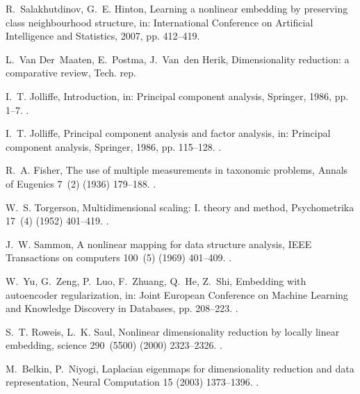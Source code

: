 \documentclass[preprint,5p,compress]{elsarticle}
\begin{document}
\begin{thebibliography}{100}
R.~Salakhutdinov, G.~E. Hinton, Learning a nonlinear embedding by preserving
  class neighbourhood structure, in: International Conference on Artificial
  Intelligence and Statistics, 2007, pp. 412--419.

L.~Van Der~Maaten, E.~Postma, J.~Van~den Herik, Dimensionality reduction: a
  comparative review, Tech. rep.

I.~T. Jolliffe, Introduction, in: Principal component analysis, Springer, 1986,
  pp. 1--7.
\newblock \href {http://dx.doi.org/10.1007/978-1-4757-1904-8}
  {}.

I.~T. Jolliffe, Principal component analysis and factor analysis, in: Principal
  component analysis, Springer, 1986, pp. 115--128.
\newblock \href {http://dx.doi.org/10.1007/978-1-4757-1904-8}
  {}.

R.~A. Fisher, The use of multiple measurements in taxonomic problems, Annals of
  Eugenics 7~(2) (1936) 179--188.
\newblock \href {http://dx.doi.org/10.1111/j.1469-1809.1936.tb02137.x}
  {}.

W.~S. Torgerson, Multidimensional scaling: I. theory and method, Psychometrika
  17~(4) (1952) 401--419.
\newblock \href {http://dx.doi.org/10.1007/BF02288916}
  {}.

J.~W. Sammon, A nonlinear mapping for data structure analysis, IEEE
  Transactions on computers 100~(5) (1969) 401--409.
\newblock \href {http://dx.doi.org/10.1109/T-C.1969.222678}
  {}.

W.~Yu, G.~Zeng, P.~Luo, F.~Zhuang, Q.~He, Z.~Shi, Embedding with autoencoder
  regularization, in: Joint European Conference on Machine Learning and
  Knowledge Discovery in Databases, pp. 208--223.
\newblock \href {http://dx.doi.org/10.1007/978-3-642-40994-3\_14}
  {}.

S.~T. Roweis, L.~K. Saul, Nonlinear dimensionality reduction by locally linear
  embedding, science 290~(5500) (2000) 2323--2326.
\newblock \href {http://dx.doi.org/10.1126/science.290.5500.2323}
  {}.

M.~Belkin, P.~Niyogi, Laplacian eigenmaps for dimensionality reduction and data
  representation, Neural Computation 15 (2003) 1373--1396.
\newblock \href {http://dx.doi.org/10.1162/089976603321780317}
  {}.


\end{thebibliography}
\end{document}

